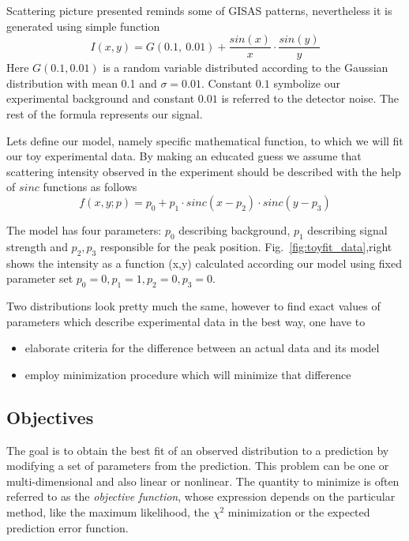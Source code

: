 Scattering picture presented reminds some of GISAS patterns, nevertheless it is
generated using simple function
$$I(x,y) = G(0.1,~0.01) + \frac{sin(x)}{x} \cdot \frac{sin(y)}{y}$$
Here $G(0.1, 0.01)$ is a random variable distributed according to the Gaussian distribution
with mean 0.1 and $\sigma=0.01$.
Constant $0.1$ symbolize our experimental background and constant $0.01$ is referred
to the detector noise. The rest of the formula represents our signal.

Lets define our model, namely specific mathematical function, to which we will fit our toy experimental data. By making an educated guess we assume that scattering intensity observed
in the experiment should be described with the help of $sinc$ functions as follows
\begin{equation} \label{eq:toy_model}
f(x,y;p) = p_0 + p_1 \cdot  sinc(x - p_2) \cdot sinc(y - p_3)
\end{equation}

The model has four parameters: $p_0$ describing background, $p_{1}$ describing signal strength
and $p_2,p_3$ responsible for the peak position.
Fig.~\ref{fig:toyfit_data},right shows the intensity as a function (x,y) calculated according
our model using fixed parameter set $p_0=0,p_1=1,p_2=0,p_3=0$. 

Two distributions look pretty much the same, however to find exact values of parameters which describe experimental data in the best way, one have to
\begin{itemize}
\item elaborate criteria for the difference between an actual data and its model
\item employ minimization procedure which will minimize that difference
\end{itemize}


\subsection{Objectives}

The goal is to obtain the best fit of an observed distribution
to a prediction by modifying a set of parameters from the
prediction. This problem can be one or multi-dimensional and also linear or
nonlinear. The quantity to minimize is often referred to as the
\textit{objective function}, whose expression depends on the
particular method, like the maximum likelihood, the $\chi^2$
minimization or the expected prediction error function. 

